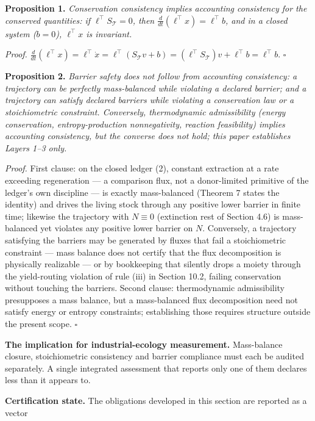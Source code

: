 \documentclass[11pt]{article}
\begin{document}
\textbf{Proposition 1.} \emph{Conservation consistency implies accounting consistency for the conserved quantities: if \(\ell^\top S_{\mathcal{T}} = 0\), then \(\frac{d}{dt}(\ell^\top x) =\allowbreak{} \ell^\top b\), and in a closed system (\(b = 0\)), \(\ell^\top x\) is invariant.}

\emph{Proof.} \(\frac{d}{dt}(\ell^\top x) =\allowbreak{} \ell^\top \dot x =\allowbreak{} \ell^\top(S_{\mathcal{T}} v +\allowbreak{} b) =\allowbreak{} (\ell^\top S_{\mathcal{T}}) v +\allowbreak{} \ell^\top b =\allowbreak{} \ell^\top b\). \(\square\)

\textbf{Proposition 2.} \emph{Barrier safety does not follow from accounting consistency: a trajectory can be perfectly mass-balanced while violating a declared barrier; and a trajectory can satisfy declared barriers while violating a conservation law or a stoichiometric constraint. Conversely, thermodynamic admissibility (energy conservation, entropy-production nonnegativity, reaction feasibility) implies accounting consistency, but the converse does not hold; this paper establishes Layers 1--3 only.}

\emph{Proof.} First clause: on the closed ledger (2), constant extraction at a rate exceeding regeneration --- a comparison flux, not a donor-limited primitive of the ledger's own discipline --- is exactly mass-balanced (Theorem 7 states the identity) and drives the living stock through any positive lower barrier in finite time; likewise the trajectory with \(N \equiv 0\) (extinction rest of Section 4.6) is mass-balanced yet violates any positive lower barrier on \(N\). Conversely, a trajectory satisfying the barriers may be generated by fluxes that fail a stoichiometric constraint --- mass balance does not certify that the flux decomposition is physically realizable --- or by bookkeeping that silently drops a moiety through the yield-routing violation of rule (iii) in Section 10.2, failing conservation without touching the barriers. Second clause: thermodynamic admissibility presupposes a mass balance, but a mass-balanced flux decomposition need not satisfy energy or entropy constraints; establishing those requires structure outside the present scope. \(\square\)

\textbf{The implication for industrial-ecology measurement.} Mass-balance closure, stoichiometric consistency and barrier compliance must each be audited separately. A single integrated assessment that reports only one of them declares less than it appears to.

\textbf{Certification state.} The obligations developed in this section are reported as a vector 
\end{document}
